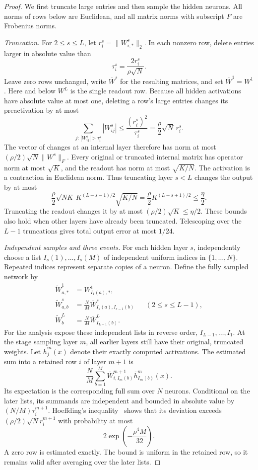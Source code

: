 \begin{proof}
We first truncate large entries and then sample the hidden neurons.
All norms of rows below are Euclidean, and all matrix norms with
subscript $F$ are Frobenius norms.

\emph{Truncation.}
For $2\leq s\leq L$, let $r_i^s=\|W^s_{i,*}\|_2$. In each nonzero
row, delete entries larger in absolute value than
\[
 \tau_i^s=\frac{2r_i^s}{\rho\sqrt N}.
\]
Leave zero rows unchanged, write $\overline W^s$ for the resulting
matrices, and set $\overline W^1=W^1$. Here and below $W^L$ is the
single readout row. Because all hidden activations have absolute value
at most one, deleting a row's large entries changes its preactivation
by at most
\[
 \sum_{j:\,|W^s_{ij}|>\tau_i^s}|W^s_{ij}|
 \leq \frac{(r_i^s)^2}{\tau_i^s}
 =\frac\rho2\sqrt N\,r_i^s.
\]
The vector of changes at an internal layer therefore has norm at most
$(\rho/2)\sqrt N\|W^s\|_F$. Every original or truncated internal
matrix has operator norm at most $\sqrt K$, and the readout has norm
at most $\sqrt{K/N}$. The activation is a contraction in Euclidean
norm. Thus truncating layer $s<L$ changes the output by at most
\[
 \frac\rho2\sqrt{NK}\,K^{(L-s-1)/2}\sqrt{K/N}
 =\frac\rho2 K^{(L-s+1)/2}\leq\frac\eta2.
\]
Truncating the readout changes it by at most
$(\rho/2)\sqrt K\leq\eta/2$. These bounds also hold when other
layers have already been truncated. Telescoping over the $L-1$
truncations gives total output error at most $1/24$.

\emph{Independent samples and three events.}
For each hidden layer $s$, independently choose a list
$I_s(1),\ldots,I_s(M)$ of independent uniform indices in
$\{1,\ldots,N\}$. Repeated indices represent separate copies of a
neuron. Define the fully sampled network by
\begin{align*}
 \widetilde W^1_{a,*}&=W^1_{I_1(a),*},\\
 \widetilde W^s_{a,b}&=\frac NM
      \overline W^s_{I_s(a),I_{s-1}(b)}
      &&(2\leq s\leq L-1),\\
 \widetilde W^L_b&=\frac NM\overline W^L_{I_{L-1}(b)}.
\end{align*}
For the analysis expose these independent lists in reverse order,
$I_{L-1},\ldots,I_1$. At the stage sampling layer $m$, all earlier
layers still have their original, truncated weights. Let
$\overline h_j^m(x)$ denote their exactly computed activations. The
estimated sum into a retained row $i$ of layer $m+1$ is
\[
 \frac NM\sum_{b=1}^M
 \overline W^{m+1}_{i,I_m(b)}\overline h^m_{I_m(b)}(x).
\]
Its expectation is the corresponding full sum over $N$ neurons.
Conditional on the later lists, its summands are independent and
bounded in absolute value by $(N/M)\tau_i^{m+1}$. Hoeffding's inequality~\cite{hoeffding}
shows that its deviation exceeds
$(\rho/2)\sqrt N r_i^{m+1}$ with probability at most
\[
 2\exp\left(-\frac{\rho^4 M}{32}\right).
\]
A zero row is estimated exactly. The bound is uniform in the retained
row, so it remains valid after averaging over the later lists.


\end{proof}
